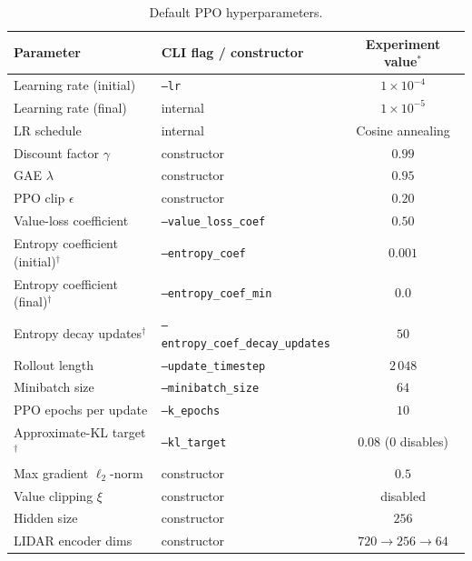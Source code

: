 \begin{table}[H]
  \centering
  \caption{Default PPO hyperparameters.}
  \label{tab:hp-ppo}
  \small
  \begin{tabular}{@{}llc@{}}
    \toprule
    \textbf{Parameter} & \textbf{CLI flag / constructor} & \textbf{Experiment value}\(^*\) \\
    \midrule
    Learning rate (initial)        & \texttt{--lr}                & \(1\times 10^{-4}\) \\
    Learning rate (final)          & internal                     & \(1\times 10^{-5}\) \\
    LR schedule                    & internal                     & Cosine annealing \\
    Discount factor \(\gamma\)     & constructor                  & \(0.99\) \\
    GAE \(\lambda\)                & constructor                  & \(0.95\) \\
    PPO clip \(\epsilon\)          & constructor                  & \(0.20\) \\
    Value-loss coefficient         & \texttt{--value\_loss\_coef} & \(0.50\) \\
    Entropy coefficient (initial)\(^\dagger\)  & \texttt{--entropy\_coef}     & \(0.001\) \\
    Entropy coefficient (final)\(^\dagger\)    & \texttt{--entropy\_coef\_min}& \(0.0\) \\
    Entropy decay updates\(^\dagger\)          & \texttt{--entropy\_coef\_decay\_updates} & \(50\) \\
    Rollout length                 & \texttt{--update\_timestep}  & \(2\,048\) \\
    Minibatch size                 & \texttt{--minibatch\_size}   & \(64\) \\
    PPO epochs per update          & \texttt{--k\_epochs}         & \(10\) \\
    Approximate-KL target\(^\dagger\)          & \texttt{--kl\_target}        & \(0.08\) (0 disables) \\
    Max gradient \(\ell_2\)-norm   & constructor                  & \(0.5\) \\
    Value clipping \(\xi\)         & constructor                  & disabled \\
    Hidden size                    & constructor                  & \(256\) \\
    LIDAR encoder dims             & constructor                  & \(720 \to 256 \to 64\) \\

\end{tabular}
\end{table}
